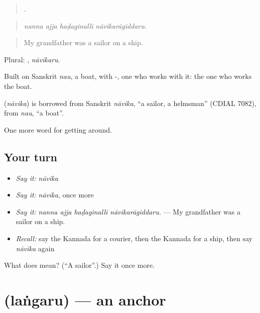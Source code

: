 \begin{quote}
   .
\end{quote}

\begin{quote}
\emph{nanna ajja haḍaginalli nāvikarāgiddaru.}
\end{quote}

\begin{quote}
My grandfather was a sailor on a ship.
\end{quote}

Plural: , \emph{nāvikaru}.

Built on Sanskrit \emph{nau}, a boat, with -, one who works with it: the one who works the boat.

\begin{cousinweb}
\textbf{} (\emph{nāvika}) is borrowed from Sanskrit \emph{nāvika}, \textquotedblleft{}a sailor, a helmsman\textquotedblright{} (CDIAL 7082), from \emph{nau}, \textquotedblleft{}a boat\textquotedblright{}.
\end{cousinweb}

\begin{grammarlens}[title={What you've built}]
One more word for getting around.
\end{grammarlens}

\subsection*{Your turn}
\begin{itemize}
\raggedright
  \item \emph{Say it:} \emph{nāvika}
  \item \emph{Say it:} \emph{nāvika}, once more
  \item \emph{Say it:} \emph{nanna ajja haḍaginalli nāvikarāgiddaru.} — My grandfather was a sailor on a ship.
  \item \emph{Recall:} say the Kannada for a courier, then the Kannada for a ship, then say \emph{nāvika} again
\end{itemize}

\begin{tcolorbox}[breakable,colback=teal!4,colframe=teal!35!black,title={Before you move on}]
What does  mean? (\textquotedblleft{}A sailor\textquotedblright{}.) Say it once more.
\end{tcolorbox}
\section[\texorpdfstring{\kn{ಲಂಗರು} (laṅgaru)}{ಲಂಗರು (laṅgaru)}]{ (laṅgaru) — an anchor}

